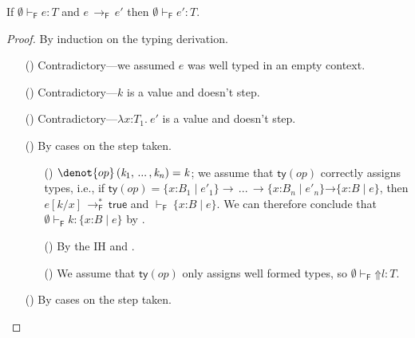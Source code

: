 \documentclass[9pt]{extarticle}
\newcommand{\ottnt}[1]{\mathit{#1}}
\newcommand{\ottmv}[1]{\mathit{#1}}
\newcommand{\ottsym}[1]{#1}
\begin{document}
{\begin{lemma}
  \label{lem:forgetfulpreservation}
  If $ \emptyset   \vdash _{  \mathsf{F}  }  \ottnt{e}  :  \ottnt{T} $ and $\ottnt{e} \,  \longrightarrow _{  \mathsf{F}  }  \, \ottnt{e'}$ then $ \emptyset   \vdash _{  \mathsf{F}  }  \ottnt{e'}  :  \ottnt{T} $.
\begin{proof}
    By induction on the typing derivation.
{\iffull
    \begin{itemize}
    \item[(\T{Var})] Contradictory---we assumed $\ottnt{e}$ was well typed
      in an empty context.
    \item[(\T{Const})] Contradictory---$\ottnt{k}$ is a value and doesn't step.
    \item[(\T{Abs})] Contradictory---$ \lambda \mathit{x} \mathord{:} \ottnt{T_{{\mathrm{1}}}} .~  \ottnt{e'} $ is a value and
      doesn't step.
    \item[(\T{Op})] By cases on the step taken.
\begin{itemize}
      \item[(\E{Op})] $\denot{ op } \, \ottsym{(}  \ottnt{k_{{\mathrm{1}}}}  \ottsym{,} \, ... \, \ottsym{,}  \ottnt{k_{\ottmv{n}}}  \ottsym{)}  \ottsym{=}  \ottnt{k}$; we assume that
        $ \mathsf{ty} (\mathord{ \ottnt{op} }) $ correctly assigns types, i.e., if $ \mathsf{ty} (\mathord{ \ottnt{op} })   \ottsym{=}   {}   \{ \mathit{x} \mathord{:} \ottnt{B_{{\mathrm{1}}}} \mathrel{\mid} \ottnt{e'_{{\mathrm{1}}}} \}   \rightarrow \, ... \, \rightarrow   \{ \mathit{x} \mathord{:} \ottnt{B_{\ottmv{n}}} \mathrel{\mid} \ottnt{e'_{\ottmv{n}}} \}   {} \mathord{ \rightarrow }  \{ \mathit{x} \mathord{:} \ottnt{B} \mathrel{\mid} \ottnt{e} \}  $, then $ \ottnt{e}  [  \ottnt{k} / \mathit{x}  ]  \,  \longrightarrow ^{*}_{  \mathsf{F}  }  \,  \mathsf{true} $ and $ \mathord{  \vdash _{  \mathsf{F}  } }~  \{ \mathit{x} \mathord{:} \ottnt{B} \mathrel{\mid} \ottnt{e} \}  $. We can therefore conclude
        that $ \emptyset   \vdash _{  \mathsf{F}  }  \ottnt{k}  :   \{ \mathit{x} \mathord{:} \ottnt{B} \mathrel{\mid} \ottnt{e} \}  $ by .
      \item[(\E{OpInner})] By the IH and .
      \item[(\E{OpRaise})] We assume that $ \mathsf{ty} (\mathord{ \ottnt{op} }) $ only assigns
        well formed types, so $ \emptyset   \vdash _{  \mathsf{F}  }   \mathord{\Uparrow}  \ottnt{l}   :  \ottnt{T} $.
      \end{itemize}
    \item[(\T{App})] By cases on the step taken.

\end{itemize}}
\end{proof}
\end{lemma}}
\end{document}
